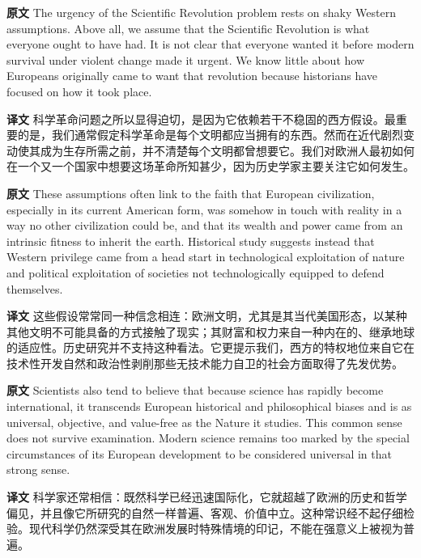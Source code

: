 \documentclass[UTF8,zihao=-4]{ctexart}
\newcommand{\BodyFont}{\fontsize{10.5pt}{15.5pt}\selectfont}
\newcommand{\origlabel}{\textbf{原文}\quad}
\newcommand{\translabel}{\textbf{译文}\quad}
\newenvironment{enblock}{\par\noindent\begingroup\BodyFont\origlabel}{\par\endgroup}
\newenvironment{zhblock}{\par\noindent\begingroup\BodyFont\translabel}{\par\endgroup\vspace{0.35em}}
\begin{document}
\begin{enblock}
The urgency of the Scientific Revolution problem rests on shaky Western assumptions. Above all, we assume that the Scientific Revolution is what everyone ought to have had. It is not clear that everyone wanted it before modern survival under violent change made it urgent. We know little about how Europeans originally came to want that revolution because historians have focused on how it took place.
\end{enblock}
\begin{zhblock}
科学革命问题之所以显得迫切，是因为它依赖若干不稳固的西方假设。最重要的是，我们通常假定科学革命是每个文明都应当拥有的东西。然而在近代剧烈变动使其成为生存所需之前，并不清楚每个文明都曾想要它。我们对欧洲人最初如何在一个又一个国家中想要这场革命所知甚少，因为历史学家主要关注它如何发生。
\end{zhblock}

\begin{enblock}
These assumptions often link to the faith that European civilization, especially in its current American form, was somehow in touch with reality in a way no other civilization could be, and that its wealth and power came from an intrinsic fitness to inherit the earth. Historical study suggests instead that Western privilege came from a head start in technological exploitation of nature and political exploitation of societies not technologically equipped to defend themselves.
\end{enblock}
\begin{zhblock}
这些假设常常同一种信念相连：欧洲文明，尤其是其当代美国形态，以某种其他文明不可能具备的方式接触了现实；其财富和权力来自一种内在的、继承地球的适应性。历史研究并不支持这种看法。它更提示我们，西方的特权地位来自它在技术性开发自然和政治性剥削那些无技术能力自卫的社会方面取得了先发优势。
\end{zhblock}

\begin{enblock}
Scientists also tend to believe that because science has rapidly become international, it transcends European historical and philosophical biases and is as universal, objective, and value-free as the Nature it studies. This common sense does not survive examination. Modern science remains too marked by the special circumstances of its European development to be considered universal in that strong sense.
\end{enblock}
\begin{zhblock}
科学家还常相信：既然科学已经迅速国际化，它就超越了欧洲的历史和哲学偏见，并且像它所研究的自然一样普遍、客观、价值中立。这种常识经不起仔细检验。现代科学仍然深受其在欧洲发展时特殊情境的印记，不能在强意义上被视为普遍。
\end{zhblock}
\end{document}
